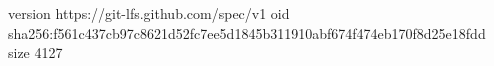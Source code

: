 version https://git-lfs.github.com/spec/v1
oid sha256:f561c437cb97c8621d52fc7ee5d1845b311910abf674f474eb170f8d25e18fdd
size 4127

